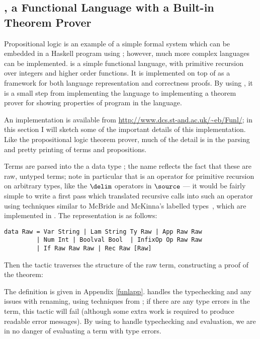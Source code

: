\subsection{\Funl{}, a Functional Language with a Built-in Theorem Prover}

\label{example2}

Propositional logic is an example of a simple formal system which can
be embedded in a Haskell program using \Ivor{}; however, much more
complex languages can be implemented. \Funl{} is a simple functional
language, with primitive recursion over integers and higher order
functions. It is implemented on top of \Ivor{} as a framework for both
language representation and correctness proofs. By using \Ivor{}, it
is a small step from implementing the language to implementing a
theorem prover for showing properties of program in the language.

An implementation is available from
\url{http://www.dcs.st-and.ac.uk/~eb/Funl/}; in this section I will
sketch some of the important details of this implementation. Like the
propositional logic theorem prover, much of the detail is in the
parsing and pretty printing of terms and propositions.

Terms are parsed into the a data type ; the name
 reflects the fact that these are raw, untyped terms; note
in particular that  is an operator for primitive recursion
on arbitrary types, like the $\delim$ operators in $\source$ --- it
would be fairly simple to write a first pass which translated
recursive calls into such an operator using techniques similar to
McBride and McKinna's labelled types~\cite{view-left}, which are
implemented in \Ivor{}. The representation is as follows:

\verb+data Raw = Var String | Lam String Ty Raw | App Raw Raw+\\
\verb+         | Num Int | Boolval Bool  | InfixOp Op Raw Raw+\\
\verb+         | If Raw Raw Raw | Rec Raw [Raw]+

Then the  tactic traverses the
structure of the raw term, constructing a proof of the
theorem:


The definition is given in Appendix \ref{funlapp}.  \Ivor{} handles
the typechecking and any issues with renaming, using techniques from
\cite{not-a-number}; if there are any type errors in the 
term, this tactic will fail (although some extra work is required to
produce readable error messages). By using \Ivor{} to handle
typechecking and evaluation, we are in no danger of evaluating a term
with type errors.


